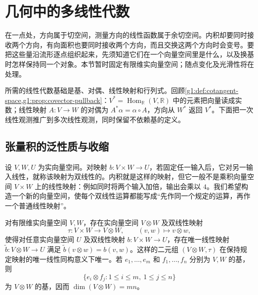 
% 
% 

\section{几何中的多线性代数}
\label{g1:sec:1202}

在一点处，方向属于切空间，测量方向的线性函数属于余切空间。内积却要同时接收两个方向，有向面积也要同时接收两个方向，而且交换这两个方向时会变号。要把这些量沿流形逐点组织起来，先须知道它们在一个向量空间里是什么，以及换基时怎样保持同一个对象。本节暂时固定有限维实向量空间；随点变化及光滑性将在处理。

\ProseParagraphBreak

所需的线性代数基础是基、对偶、线性映射和行列式。回顾\cref{g1:def:cotangent-space,g1:prop:covector-pullback}：\(V^*=\operatorname{Hom}_{\mathbb R}(V,\mathbb R)\) 中的元素把向量读成实数；线性映射 \(A:V\to W\) 的对偶为 \(A^*\alpha=\alpha\circ A\)，方向从 \(W^*\) 返回 \(V^*\)。下面把一次线性观测推广到多次线性观测，同时保留不依赖基的定义。

\subsection{张量积的泛性质与收缩}
\label{g1:subsec:1202:01}

设 \(V,W,U\) 为实向量空间。对映射 \(b:V\times W\to U\)，若固定任一输入后，它对另一输入线性，就称该映射为双线性的。内积就是这样的映射，但它一般不是乘积向量空间 \(V\times W\) 上的线性映射：例如同时将两个输入加倍，输出会乘以 \(4\)。我们希望构造一个新的向量空间，使每个双线性运算都能写成“先作同一个规定的运算，再作一个普通线性映射”。

\begin{theorem}
	\label{g1:thm:tensor-product-universal}
	对有限维实向量空间 \(V,W\)，存在实向量空间 \(V\otimes W\) 及双线性映射
	\[
		\tau:V\times W\longrightarrow V\otimes W,\qquad (v,w)\longmapsto v\otimes w,
	\]
	使得对任意实向量空间 \(U\) 及双线性映射 \(b:V\times W\to U\)，存在唯一线性映射 \(\widetilde b:V\otimes W\to U\) 满足 \(\widetilde b(v\otimes w)=b(v,w)\)。这样的二元组 \((V\otimes W,\tau)\) 在保持规定映射的唯一线性同构意义下唯一。若 \(e_1,\ldots,e_m\) 和 \(f_1,\ldots,f_n\) 分别为 \(V,W\) 的基，则
	\[
		\{e_i\otimes f_j:1\le i\le m,\ 1\le j\le n\}
	\]
	为 \(V\otimes W\) 的基，因而 \(\dim(V\otimes W)=mn\)。
\end{theorem}


